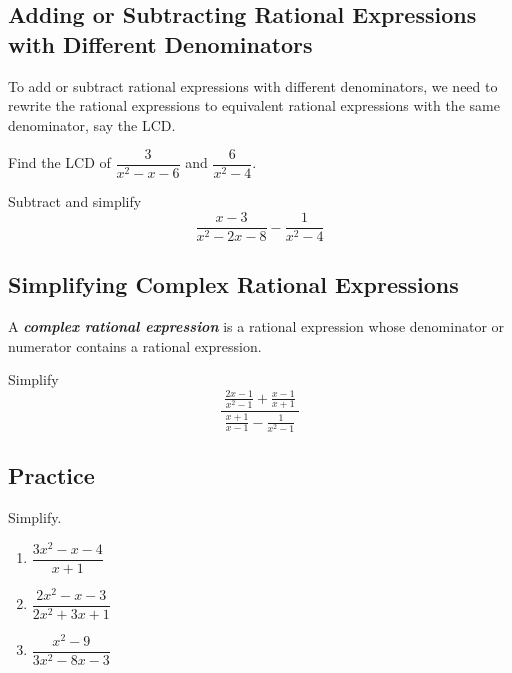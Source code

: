 \hypertarget{adding-or-subtracting-rational-expressions-with-different-denominators}{%
\subsection{Adding or Subtracting Rational Expressions with Different
Denominators}\label{adding-or-subtracting-rational-expressions-with-different-denominators}}

To add or subtract rational expressions with different denominators, we
need to rewrite the rational expressions to equivalent rational
expressions with the same denominator, say the LCD.

\begin{example}
  Find the LCD of \(\dfrac{3}{x^2-x-6}\) and \(\dfrac{6}{x^2-4}\).
\end{example}
\vspace*{4\baselineskip}

\begin{example}
  Subtract and simplify\\
  \[\frac{x-3}{x^2-2x-8}- \frac{1}{x^2-4}\]
\end{example}
\vspace*{4\baselineskip}

\hypertarget{simplifying-complex-rational-expressions}{%
\subsection{Simplifying Complex Rational
Expressions}\label{simplifying-complex-rational-expressions}}

A \textbf{\emph{complex rational expression}} is a rational expression
whose denominator or numerator contains a rational expression.

\begin{example}
  Simplify \[
  \frac{~\frac{2x-1}{x^2-1}+\frac{x-1}{x+1}~}{~\frac{x+1}{x-1}-\frac{1}{x^2-1}~}
  \]
\end{example}
\vspace*{4\baselineskip}

\subsection{Practice}

\begin{exercise}
  Simplify.
  
  \begin{enumerate}
  \item
    \(\dfrac{3x^2-x-4}{x+1}\)
  \item
    \(\dfrac{2x^2-x-3}{2x^2+3x+1}\)
  \item
    \(\dfrac{x^2-9}{3x^2-8x-3}\)
  \end{enumerate}
\end{exercise}

